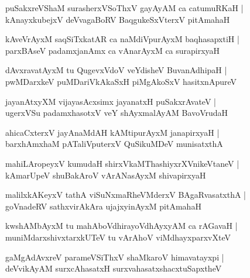\begin{shloka}
puSakxreVShaM surasherxVSoThxV gayAyAM ca catumuRKaH |\\
kAnayxkubejxV deVvagaBoRV BaqgukeSxVterxV pitAmahaH
\end{shloka}

\begin{shloka}
kAveVrAyxM saqSiTxkatAR ca naMdiVpurAyxM baqhasapxtiH |\\
parxBAseV padamxjanAmx ca vAnarAyxM ca surapirxyaH 
\end{shloka}

\begin{shloka}
dAvxravatAyxM tu QugevxVdoV veYdisheV BuvanAdhipaH |\\
pwMDarxkeV puMDariVkAkaSxH piMgAkoSxV hasitxnApureV 
\end{shloka}

\begin{shloka}
jayanAtxyXM vijayasAcxsimx jayanatxH puSakxrAvateV |\\
ugerxVSu padamxhasotxV veY shAyxmalAyAM BavoVrudaH 
\end{shloka}

\begin{shloka}
ahicaCxterxV jayAnaMdAH kAMtipurAyxM janapirxyaH |\\
barxhAmxhaM pATaliVputerxV QuSikuMDeV munisatxthA
\end{shloka}

\begin{shloka}
mahiLAropeyxV kumudaH shirxVkaMThashiyxrXVnikeVtaneV |\\
kAmarUpeV shuBakAroV vArANasAyxM shivapirxyaH 
\end{shloka}

\begin{shloka}
malilxkAKeyxV tathA viSuNxmaRheVMderxV BAgaRvasatxthA |\\
goVnadeRV sathxvirAkAra ujajxyinAyxM pitAmahaH 
\end{shloka}

\begin{shloka}
kwshAMbAyxM tu mahAboVdhirayoVdhAyxyAM ca rAGavaH |\\
muniMdarxshivxtarxkUTeV tu vArAhoV viMdhayxparxvXteV 
\end{shloka}

\begin{shloka}
gaMgAdAvxreV parameVSiThxV shaMkaroV himavatayxpi |\\
deVvikAyAM surxcAhasatxH surxvahasatxshacxtuSapxtheV 
\end{shloka}

